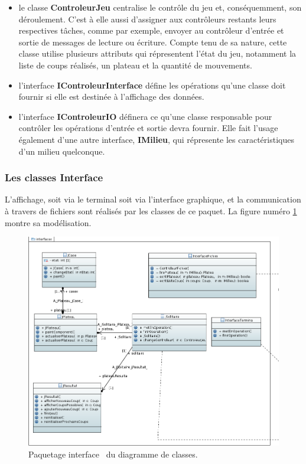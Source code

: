 \documentclass{article}
\begin{document}
\begin {itemize}
  \item le classe \textbf{ControleurJeu} centralise le contrôle du jeu et,
  conséquemment, son déroulement. C'est à elle aussi d'assigner aux contrôleurs
  restants leurs respectives tâches, comme par exemple, envoyer au contrôleur
  d'entrée et sortie de messages de lecture ou écriture. Compte tenu de sa
  nature, cette classe utilise plusieurs attributs qui répresentent l'état du
  jeu, notamment la liste de coups réalisés, un plateau et la quantité de
  mouvements.
  
  \vspace{12pt}
  
  \item l'interface \textbf{IControleurInterface} défine les opérations qu'une
  classe doit fournir si elle est destinée à l'affichage des données.
  
  \vspace{12pt}
  
  \item l'interface \textbf{IControleurIO} définera ce qu'une classe
  responsable pour contrôler les opérations d'entrée et sortie devra fournir.
  Elle fait l'usage également d'une autre interface, \textbf{IMilieu}, qui
  répresente les caractéristiques d'un milieu quelconque.
\end{itemize}

\subsubsection{Les classes \og Interface \fg}

L’affichage, soit via le terminal soit via l’interface graphique, et la
communication à travers de fichiers sont réalisés par les classes de ce paquet.
La figure numéro \ref{fig:classes_inteface} montre  sa modélisation.

\begin{figure}[h]
\centering
\includegraphics[scale=0.45]{images/interface}
\caption{Paquetage \og interface \fg ~du diagramme de classes.}
\label{fig:classes_inteface}
\end{figure}
\end{document}
